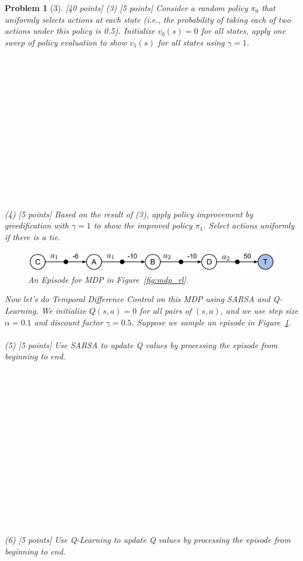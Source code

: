 \documentclass[12pt]{article}
\theoremstyle{quest}
\newtheorem*{problem}{Problem}
\begin{document}
\begin{problem}[3] [40 points]
(3) [5 points] Consider a random policy $\pi_0$ that uniformly selects actions at each state (i.e., the probability of taking each of two actions under this policy is 0.5). Initialize $v_0(s)=0$ for all states, apply one sweep of policy evaluation to show $v_1(s)$ for all states using \underline{$\gamma=1$}.\\\\\\\\\\\\\\\\\\\\\\\\\\\\\\
(4) [5 points] Based on the result of (3), apply policy improvement by greedification with \underline{$\gamma=1$} to show the improved policy $\pi_1$. Select actions uniformly if there is a tie.


\newpage
\begin{figure}[h!]
\centering
  \includegraphics[width=.9\textwidth]{mdp_episode.png}
  \caption{An Episode for MDP in Figure~\ref{fig:mdp_rl}.}
  \label{fig:mdp_episode}
\end{figure}
\noindent
Now let's do Temporal Difference Control on this MDP using SARSA and Q-Learning. We initialize $Q(s,a)=0$ for all pairs of $(s,a)$, and we use step size \underline{$\alpha=0.1$} and discount factor \underline{$\gamma=0.5$}. Suppose we sample an episode in Figure~\ref{fig:mdp_episode}.\\\\
(5) [5 points] Use SARSA to update Q values by processing the episode from beginning to end.\\\\\\\\\\\\\\\\\\\\\\\\\\\\\\\\
(6) [5 points] Use Q-Learning to update Q values by processing the episode from beginning to end.
\end{problem}
\end{document}

